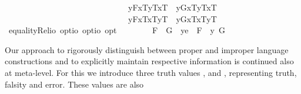 \begin{isabellebody}
\ \ \ \ \ \ \ \ \ \ \ \ \ \ \ \ \ \ \ \ \ \ \ \ \ \ \ \ \ \isactrlbold {\isasymand}\ {\isacharparenleft}\isactrlbold {\isasymlambda}y{\isachardot}{\isasymlparr}F{}{\isacharcomma}x{}\isactrlsup T{\isacharcomma}y\isactrlsup T{\isacharcomma}x{}\isactrlsup T{\isasymrparr}{\isacharparenright}\ \isactrlbold {\isacharequal}\ {\isacharparenleft}\isactrlbold {\isasymlambda}y{\isachardot}{\isasymlparr}G{}{\isacharcomma}x{}\isactrlsup T{\isacharcomma}y\isactrlsup T{\isacharcomma}x{}\isactrlsup T{\isasymrparr}{\isacharparenright}\isanewline
\ \ \ \ \ \ \ \ \ \ \ \ \ \ \ \ \ \ \ \ \ \ \ \ \ \ \ \ \ \isactrlbold {\isasymand}\ {\isacharparenleft}\isactrlbold {\isasymlambda}y{\isachardot}{\isasymlparr}F{}{\isacharcomma}x{}\isactrlsup T{\isacharcomma}x{}\isactrlsup T{\isacharcomma}y\isactrlsup T{\isasymrparr}{\isacharparenright}\ \isactrlbold {\isacharequal}\ {\isacharparenleft}\isactrlbold {\isasymlambda}y{\isachardot}{\isasymlparr}G{}{\isacharcomma}x{}\isactrlsup T{\isacharcomma}x{}\isactrlsup T{\isacharcomma}y\isactrlsup T{\isasymrparr}{\isacharparenright}{\isacharparenright}{\isachardoublequoteclose}\isanewline
\isanewline
\ \isamarkupfalse%
\ equalityRel{}{\isacharcolon}{\isacharcolon}{\isachardoublequoteopen}io\ opt{\isasymRightarrow}io\ opt{\isasymRightarrow}io\ opt{\isachardoublequoteclose}\ {\isacharparenleft}\ {\isachardoublequoteopen}\isactrlbold {\isacharequal}\ {}{}{\isacharparenright}\ \isanewline
\ \ \ \ {\isachardoublequoteopen}F{}\ \isactrlbold {\isacharequal}\ G{}\ {\isasymequiv}\ {\isacharparenleft}\isactrlbold {\isasymlambda}y{\isacharcolon}{\isacharcolon}e\ {\isachardot}\ F{}{\isacharparenright}\ \isactrlbold {\isacharequal}\ {\isacharparenleft}\isactrlbold {\isasymlambda}y{\isachardot}\ G{}{\isacharparenright}{\isachardoublequoteclose}%
\isamarkuptrue%
%
\begin{isamarkuptext}%
Our approach to rigorously distinguish between proper and improper language constructions 
  and to explicitly maintain respective information is continued also at meta-level. For this 
  we introduce three truth values ,
   and , representing truth, falsity and error. These values are also 

\end{isamarkuptext}
\end{isabellebody}

